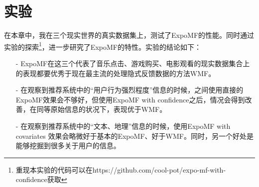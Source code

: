 \documentclass[notitlepage,cs4size,punct,oneside]{ctexrep}
\numberwithin{equation}{chapter}
\theoremstyle{mystyle}
\begin{document}
\chapter{实验}

在本章中，我在三个现实世界的真实数据集上，测试了ExpoMF的性能。同时通过实验的探索\footnote{重现本实验的代码可以在https://github.com/cool-pot/expo-mf-with-confidence获取}，进一步研究了ExpoMF的特性。实验的结论如下：
\begin{itemize}
	\item[-] ExpoMF在这三个代表了音乐点击、游戏购买、电影观看的现实数据集合上的表现都要优秀于现在最主流的处理隐式反馈数据的方法WMF\cite{WMF}。
	\item[-] 在观察到推荐系统中的“用户行为强烈程度”信息的时候，之间使用直接的ExpoMF效果会不够好，但使用ExpoMF with confidence之后，情况会得到改善，在同等原始信息的状况下，表现优于WMF\cite{WMF}。
	\item[-] 在观察到推荐系统中的“文本、地理”信息的时候，使用ExpoMF with covariates 效果会略微好于基本的ExpoMF、好于WMF。同时，另一个好处是能够挖掘到很多关于用户的信息。

\end{itemize}
\end{document}
